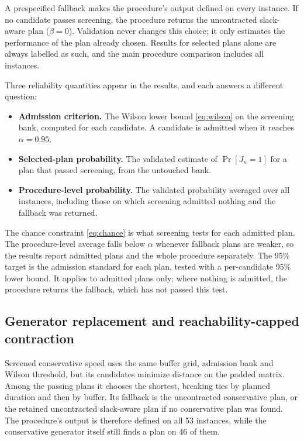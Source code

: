 \documentclass[11pt,a4paper]{article}
\begin{document}
A prespecified fallback makes the procedure's output defined on every instance.
If no candidate passes screening, the procedure returns the uncontracted
slack-aware plan ($\beta=0$). Validation never changes this choice; it only
estimates the performance of the plan already chosen. Results for selected plans alone are always labelled as such, and
the main procedure comparison includes all instances.

Three reliability quantities appear in the results, and each answers a different
question:
\begin{itemize}
  \item[$\bullet$] \textbf{Admission criterion.} The Wilson lower bound \eqref{eq:wilson} on
        the screening bank, computed for each candidate. A candidate is admitted
        when it reaches $\alpha=0.95$.
  \item[$\bullet$] \textbf{Selected-plan probability.} The validated estimate of
        $\Pr[J_\kappa=1]$ for a plan that passed screening, from the untouched
        bank.
  \item[$\bullet$] \textbf{Procedure-level probability.} The validated probability averaged
        over all instances, including those on which screening admitted nothing
        and the fallback was returned.
\end{itemize}
The chance constraint \eqref{eq:chance} is what screening tests for each
admitted plan. The procedure-level average falls below $\alpha$ whenever fallback
plans are weaker, so the results report admitted plans and the whole procedure
separately. The 95\% target is the admission standard for each plan, tested
with a per-candidate 95\% lower bound. It applies to admitted plans only; where
nothing is admitted, the procedure returns the fallback, which has not passed
this test.

\subsection{Generator replacement and reachability-capped contraction}\label{sec:capping}

Screened conservative speed uses the same buffer grid, admission bank and
Wilson threshold, but its candidates minimize distance on the padded matrix.
Among the passing plans it chooses the shortest, breaking ties by planned
duration and then by buffer. Its fallback is the uncontracted conservative plan,
or the retained uncontracted slack-aware plan if no conservative plan was found.
The procedure's output is therefore defined on all 53 instances, while the
conservative generator itself still finds a plan on 46 of them.
\end{document}
